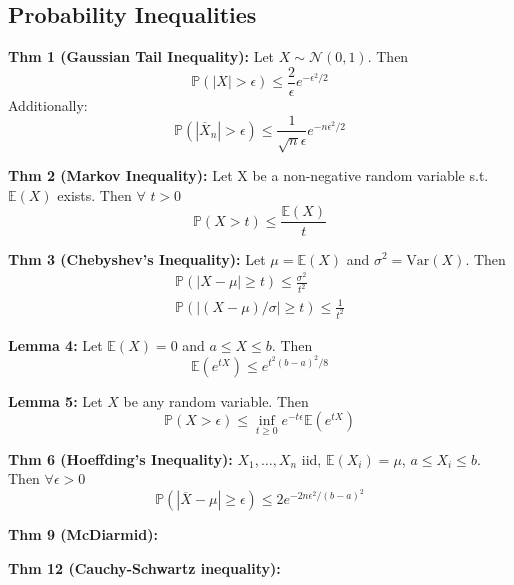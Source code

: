 \documentclass[10pt,twocolumn]{article}
\begin{document}
\subsection*{Probability Inequalities}
\textbf{Thm 1 (Gaussian Tail Inequality):}
Let $X \sim \mathcal{N}(0,1)$. Then
\begin{equation}
    \mathbb{P}(|X| > \epsilon) \leq \frac{2}{\epsilon}e^{-\epsilon^{2}/2}
\end{equation}
Additionally:
\begin{equation}
\mathbb{P}(|\overline{X}_{n}| > \epsilon) \leq \frac{1}{\sqrt{n}\epsilon}e^{-n\epsilon^{2}/2}
\end{equation}
    
\textbf{Thm 2 (Markov Inequality):}
Let X be a non-negative random variable s.t. $\mathbb{E}(X)$ exists. Then $\forall$ $t>0$
\begin{equation}
    \mathbb{P}(X>t) \leq \frac{\mathbb{E}(X)}{t}
\end{equation}

\textbf{Thm 3 (Chebyshev's Inequality):}
Let $\mu = \mathbb{E}(X)$ and $\sigma^{2} = \text{Var}(X)$. Then
\begin{gather}
    \mathbb{P}(|X-\mu| \geq t) \leq \frac{\sigma^{2}}{t^{2}} \\
    \mathbb{P}(|(X-\mu)/\sigma| \geq t) \leq \frac{1}{t^{2}}
\end{gather}

\textbf{Lemma 4:}
Let $\mathbb{E}(X) = 0$ and $a \leq X \leq b$. Then
\begin{equation}
    \mathbb{E}(e^{tX}) \leq e^{t^{2}(b-a)^{2}/8}
\end{equation}

\textbf{Lemma 5:}
Let $X$ be any random variable. Then
\begin{equation}
    \mathbb{P}(X>\epsilon) \leq \inf_{t \geq 0} e^{-t\epsilon} \mathbb{E}(e^{tX})
\end{equation}

\textbf{Thm 6 (Hoeffding's Inequality):}
$X_{1},\ldots,X_{n}$ iid, $\mathbb{E}(X_{i}) = \mu$, $a \leq X_{i} \leq b$. Then $\forall \epsilon >0$
\begin{equation}
    \mathbb{P}(|\overline{X} - \mu| \geq \epsilon) \leq 2e^{-2n\epsilon^{2}/(b-a)^{2}}
\end{equation}

\textbf{Thm 9 (McDiarmid):}

\textbf{Thm 12 (Cauchy-Schwartz inequality):}
\end{document}
